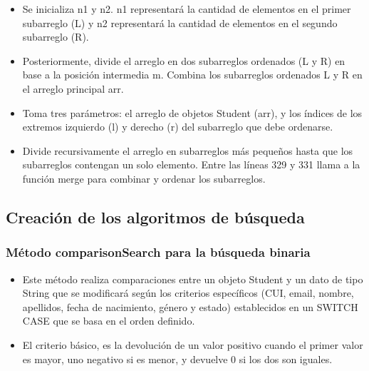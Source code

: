 \documentclass{article}
\begin{document}
        \begin{itemize}	
            \item Se inicializa n1 y n2. n1 representará la cantidad de elementos en el primer subarreglo (L) y n2 representará la cantidad de elementos en el segundo subarreglo (R). 
            \item Posteriormente, divide el arreglo en dos subarreglos ordenados (L y R) en base a la posición intermedia m. Combina los subarreglos ordenados L y R en el arreglo principal arr.
        \end{itemize}

        

        \begin{itemize}
            \item Toma tres parámetros: el arreglo de objetos Student (arr), y los índices de los extremos izquierdo (l) y derecho (r) del subarreglo que debe ordenarse. \item Divide recursivamente el arreglo en subarreglos más pequeños hasta que los subarreglos contengan un solo elemento. Entre las líneas 329 y 331 llama a la función merge para combinar y ordenar los subarreglos.
	\end{itemize}


    \subsection{Creación de los algoritmos de búsqueda}

    \subsubsection{Método comparisonSearch para la búsqueda binaria}
    
    
        
        \begin{itemize}	
            \item Este método realiza comparaciones entre un objeto Student y un dato de tipo String que se modificará según los criterios específicos (CUI, email, nombre, apellidos, fecha de nacimiento, género y estado) establecidos en un SWITCH CASE que se basa en el orden definido.
            \item El criterio básico, es la devolución de un valor positivo cuando el primer valor es mayor, uno negativo si es menor, y devuelve 0 si los dos son iguales.
	\end{itemize}
 
\end{document}
